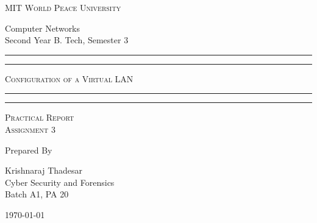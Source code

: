 \documentclass[11pt]{article}
\begin{document}
\begin{titlepage}
	\centering


	\huge\textsc{
		MIT World Peace University
	}\\

	\vspace{0.75\baselineskip} %

	\LARGE{
		Computer Networks\\
		Second Year B. Tech, Semester 3
	}

	\vfill %


	\rule{\textwidth}{1.6pt}\vspace*{-\baselineskip}\vspace*{2pt}
	\rule{\textwidth}{0.6pt}
	\vspace{0.75\baselineskip} %



	\huge{\textsc{
			Configuration of a Virtual LAN
		}} \\



	\vspace{0.5\baselineskip} %
	\rule{\textwidth}{0.6pt}\vspace*{-\baselineskip}\vspace*{2.8pt}
	\rule{\textwidth}{1.6pt}

	\vspace{1\baselineskip} %


	\LARGE\textsc{
		Practical Report\\
		Assignment 3
	} %
	\vfill


	Prepared By
	\vspace{0.5\baselineskip} %

	\Large{
		Krishnaraj Thadesar \\
		Cyber Security and Forensics\\
		Batch A1, PA 20
	}


	\vspace{0.5\baselineskip} %
	\today

\end{titlepage}
\end{document}
